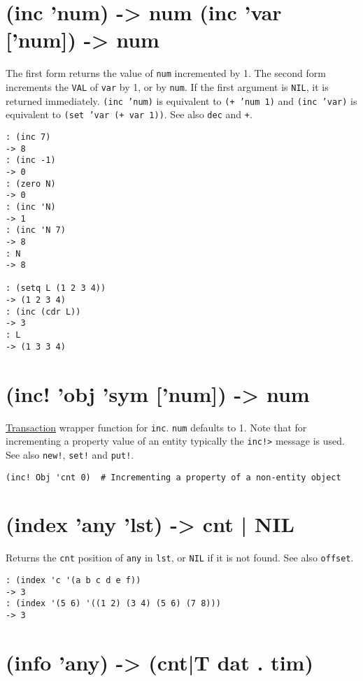 {{{{{{ 
\section{(inc 'num) -> num (inc 'var ['num]) -> num}
\label{sec-8-1-9-10}


The first form returns the value of \texttt{num} incremented by 1. The second
form increments the \texttt{VAL} of \texttt{var} by 1, or by \texttt{num}. If the first
argument is \texttt{NIL}, it is returned immediately. \texttt{(inc 'num)} is
equivalent to \texttt{(+ 'num 1)} and \texttt{(inc 'var)} is equivalent to
\texttt{(set 'var (+ var 1))}. See also \texttt{dec} and \texttt{+}.


\begin{verbatim}
: (inc 7)
-> 8
: (inc -1)
-> 0
: (zero N)
-> 0
: (inc 'N)
-> 1
: (inc 'N 7)
-> 8
: N
-> 8

: (setq L (1 2 3 4))
-> (1 2 3 4)
: (inc (cdr L))
-> 3
: L
-> (1 3 3 4)
\end{verbatim}

 
\section{(inc! 'obj 'sym ['num]) -> num}
\label{sec-8-1-9-11}


\hyperref[ref.html-trans]{Transaction} wrapper function for \texttt{inc}. \texttt{num}
defaults to 1. Note that for incrementing a property value of an entity
typically the \texttt{inc!>} message is used. See also \texttt{new!}, \texttt{set!} and
\texttt{put!}.


\begin{verbatim}
(inc! Obj 'cnt 0)  # Incrementing a property of a non-entity object
\end{verbatim}

 
\section{(index 'any 'lst) -> cnt | NIL}
\label{sec-8-1-9-12}


Returns the \texttt{cnt} position of \texttt{any} in \texttt{lst}, or \texttt{NIL} if it is not
found. See also \texttt{offset}.


\begin{verbatim}
: (index 'c '(a b c d e f))
-> 3
: (index '(5 6) '((1 2) (3 4) (5 6) (7 8)))
-> 3
\end{verbatim}

 
\section{(info 'any) -> (cnt|T dat . tim)}
\label{sec-8-1-9-13}


}}}}}}
